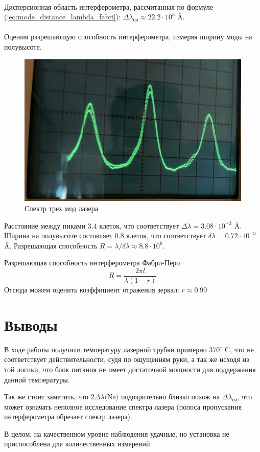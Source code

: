 \documentclass{article}
\begin{document}
\paragraph{}
Дисперсионная область интерферометра, рассчитанная по
формуле (\ref{eq:mode_distance_lambda_fabri}): $\Delta\lambda_{си} \approx 22.2\cdot10^3$
\AA\@. 

\paragraph{}
Оценим разрешающую способность интерферометра, измеряя ширину моды на полувысоте.

\begin{figure}[h]
    \center\includegraphics[width=0.5\linewidth]{solo_peak.jpg}
    \caption{Спектр трех мод лазера}\label{fig:solo_peak}
\end{figure}

Расстояние между пиками $3.4$ клеток, что соответствует
$\Delta\lambda = 3.08\cdot10^{-3}$ \AA\@. Ширина на полувысоте состовляет $0.8$ клеток,
что соответствует $\delta\lambda = 0.72 \cdot 10^{-3}$ \AA\@. Разрешающая способность
$R=\lambda/\delta\lambda\approx8.8\cdot10^6$.

Разрешающая способность интерферометра Фабри-Перо
\begin{equation}
    R = \frac{2\pi l}{\lambda(1-r)}
\end{equation}
Отсюда можем оценить коэффициент отражения зеркал: $r\approx0.90$

\section{Выводы}
В ходе работы получили температуру лазерной трубки примерно $370^\circ$ C, что
не соответствует действительности, судя по ощущениям руки, а так же исходя из той логики,
что блок питания не имеет достаточной мощности для поддержания данной температуры.

Так же стоит заметить, что $2\Delta \lambda\text{(Ne)}$ подозрительно близко похож
на $\Delta \lambda_{си}$, что может означать неполное исследование спектра лазера
(полоса пропускания интерферометра обрезает спектр лазера).

В целом, на качественном уровне наблюдения удачные, но установка не приспособлена
для количественных измерений.
\end{document}
